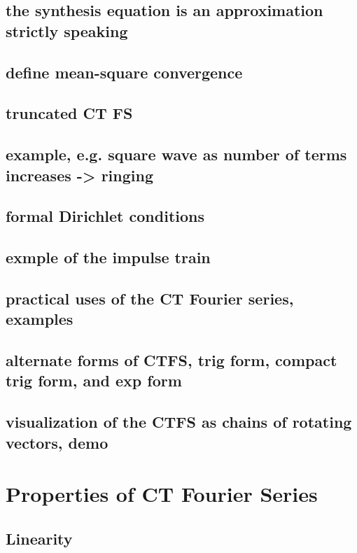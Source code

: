 \documentclass{article}
\begin{document}
\subsection{the synthesis equation is an approximation strictly speaking}
\label{sec:orge86364a}
\subsection{define mean-square convergence}
\label{sec:org992f2f9}
\subsection{truncated CT FS}
\label{sec:org1a31840}
\subsection{example, e.g. square wave as number of terms increases -> ringing}
\label{sec:org5b9a020}
\subsection{formal Dirichlet conditions}
\label{sec:orgd932eed}
\subsection{exmple of the impulse train}
\label{sec:org01d1aa2}
\subsection{practical uses of the CT Fourier series, examples}
\label{sec:org9bb1861}
\subsection{alternate forms of CTFS, trig form, compact trig form, and exp form}
\label{sec:org1f25d25}
\subsection{visualization of the CTFS as chains of rotating vectors, demo}
\label{sec:org969c81d}
\section{Properties of CT Fourier Series}
\label{sec:org1620a4a}
\subsection{Linearity}
\label{sec:org85da9b6}
\end{document}
